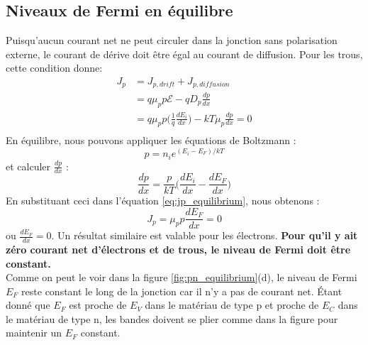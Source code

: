 \subsection{Niveaux de Fermi en équilibre}
Puisqu'aucun courant net ne peut circuler dans la jonction sans polarisation externe, le courant de dérive doit être égal au courant de diffusion. Pour les trous, cette condition donne:
\begin{equation}
    \begin{split}
       J_p  &= J_{p, drift} + J_{p, diffusion} \\
            &= q \mu_p p \mathcal{E} - q D_p \frac{dp}{dx} \\
            &= q \mu_p p \Big(\frac{1}{q} \frac{dE_i}{dx} \Big) - k T \mu_p \frac{dp}{dx}  = 0\\
    \end{split}
    \label{eq:jp_equilibrium}
\end{equation}
En équilibre, nous pouvons appliquer les équations de Boltzmann :
\begin{equation}
    p = n_i e^{(E_i - E_F)/kT}
    \label{eq:boltzmann_ch2}
\end{equation}
et calculer $\frac{dp}{dx}$ :
$$
\frac{dp}{dx} = \frac{p}{kT} \Big( \frac{dE_i}{dx} - \frac{dE_F}{dx} \Big)
$$
En substituant ceci dans l'équation \ref{eq:jp_equilibrium}, nous obtenons :
$$
J_p = \mu_p p \frac{dE_F}{dx} = 0 
$$
ou $\frac{dE_F}{dx} = 0$. Un résultat similaire est valable pour les électrons. \textbf{Pour qu'il y ait zéro courant net d'électrons et de trous, le niveau de Fermi doit être constant.}\\
Comme on peut le voir dans la figure \ref{fig:pn_equilibrium}(d), le niveau de Fermi $E_F$ reste constant le long de la jonction car il n'y a pas de courant net. Étant donné que $E_F$ est proche de $E_V$ dans le matériau de type p et proche de $E_C$ dans le matériau de type n, les bandes doivent se plier comme dans la figure pour maintenir un $E_F$ constant.

